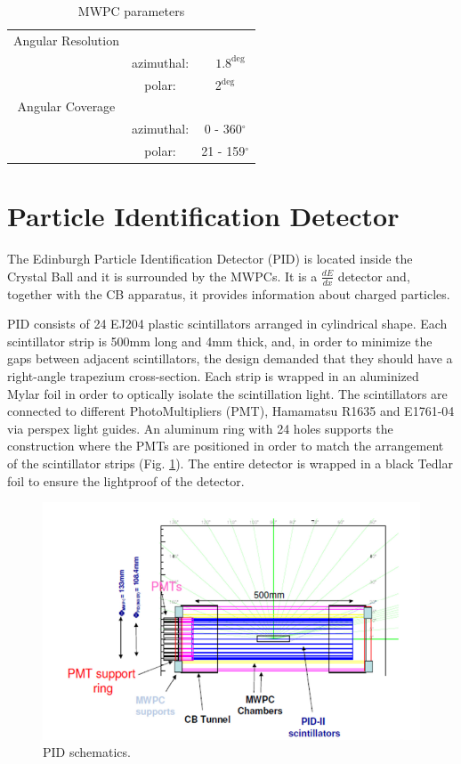 \begin{table}[ht]
\caption{MWPC parameters}
\centering
\begin{tabular}{c c c}
\hline\hline
Angular Resolution & & \\
 & azimuthal: & ~ $1.8^{\deg}$ \\
 & polar: & 2$^{\deg}$ \\
\hline
Angular Coverage & & \\
 & azimuthal: & 0 - 360$^{\circ}$ \\
 & polar: & 21 - 159$^{\circ}$ \\
\hline\hline
\end{tabular}
\label{table_cbparam}
\end{table} 

\section{Particle Identification Detector}

\indent The Edinburgh Particle Identification Detector (PID) is located inside the Crystal Ball and it is surrounded by the MWPCs. It is a $\frac{dE}{dx}$ detector and, together with the CB apparatus, it provides information about charged particles.

\indent PID consists of 24 EJ204 plastic scintillators arranged in cylindrical shape. Each scintillator strip is 500mm long and 4mm thick, and, in order to minimize the gaps between adjacent scintillators, the design demanded that they should have a right-angle trapezium cross-section. Each strip is wrapped in an aluminized Mylar foil in order to  optically  isolate  the scintillation  light.  The  scintillators  are  connected  to different PhotoMultipliers (PMT), Hamamatsu R1635 and E1761-04 via perspex light guides. An aluminum ring with 24 holes supports the construction  where the PMTs are positioned in order to match the arrangement of  the  scintillator  strips (Fig. \ref{pid}).  The  entire detector is wrapped in a black Tedlar foil to ensure the lightproof of the detector.

\begin{figure}[H]
\begin{center}
\includegraphics[scale=0.5]{pictures/png/pidschematics.png}
\caption{PID schematics.}
\label{pid}
\end{center}
\end{figure}

